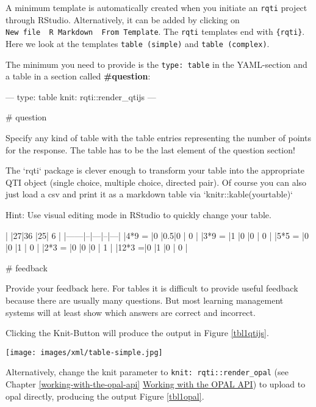 \documentclass[twoside]{tufte-book}
\newenvironment{Shaded}{}{}
\begin{document}
A minimum template is automatically created when you initiate an \texttt{rqti} project through RStudio. Alternatively, it can be added by clicking on \texttt{New\ file\ \textrightarrow{}\ R\ Markdown\ \textrightarrow{}\ From\ Template}. The \texttt{rqti} templates end with \texttt{\{rqti\}}. Here we look at the templates \texttt{table\ (simple)} and \texttt{table\ (complex)}.

The minimum you need to provide is the \texttt{type:\ table} in the YAML-section and a table in a section called \textbf{\#question}:

\begin{Shaded}
\begin{Highlighting}
---
type: table
knit: rqti::render_qtijs
---

# question

Specify any kind of table with the table entries representing the number of
points for the response. The table has to be the last element of the question
section!

The `rqti` package is clever enough to transform your table into the appropriate
QTI object (single choice, multiple choice, directed pair). Of course you can
also just load a csv and print it as a markdown table via
`knitr::kable(yourtable)`

Hint: Use visual editing mode in RStudio to quickly change your table.

|      |27|36 |25| 6 |
|------|--|---|--|---|
|4*9 = |0 |0.5|0 | 0 |
|3*9 = |1 |0  |0 | 0 |
|5*5 = |0 |0  |1 | 0 |
|2*3 = |0 |0  |0 | 1 |
|12*3 =|0 |1  |0 | 0 |

# feedback

Provide your feedback here. For tables it is difficult to provide useful
feedback because there are usually many questions. But most learning management
systems will at least show which answers are correct and incorrect.
\end{Highlighting}
\end{Shaded}

Clicking the Knit-Button will produce the output in Figure \ref{tbl1qtijs}.

\begin{figure*}
\centering
\texttt{[image: images/xml/table-simple.jpg]}
\caption{\label{tbl1qtijs}Preview of table task rendered by qtijs}
\end{figure*}

\noindent Alternatively, change the knit parameter to \texttt{knit:\ rqti::render\_opal} (see Chapter \ref{working-with-the-opal-api} \href{api_opal.html}{Working with the OPAL API}) to upload to opal directly, producing the output Figure \ref{tbl1opal}.
\end{document}
